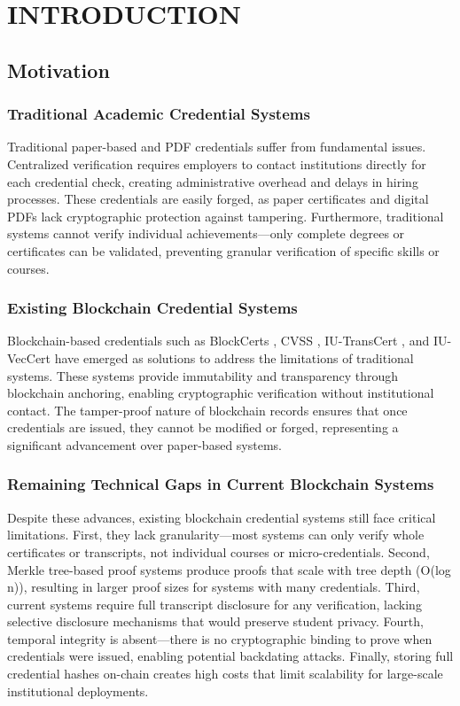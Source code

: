 \chapter{INTRODUCTION}
\label{ch:introduction}

\section{Motivation}

\subsection{Traditional Academic Credential Systems}
Traditional paper-based and PDF credentials suffer from fundamental issues. Centralized verification requires employers to contact institutions directly for each credential check, creating administrative overhead and delays in hiring processes. These credentials are easily forged, as paper certificates and digital PDFs lack cryptographic protection against tampering. Furthermore, traditional systems cannot verify individual achievements—only complete degrees or certificates can be validated, preventing granular verification of specific skills or courses.

\subsection{Existing Blockchain Credential Systems}
Blockchain-based credentials such as BlockCerts \cite{blockcerts_mit}, CVSS \cite{nguyen2018cvss}, IU-TransCert \cite{le_iutranscert}, and IU-VecCert \cite{nguyen2024iuvec} have emerged as solutions to address the limitations of traditional systems. These systems provide immutability and transparency through blockchain anchoring, enabling cryptographic verification without institutional contact. The tamper-proof nature of blockchain records ensures that once credentials are issued, they cannot be modified or forged, representing a significant advancement over paper-based systems.

\subsection{Remaining Technical Gaps in Current Blockchain Systems}
Despite these advances, existing blockchain credential systems still face critical limitations. First, they lack granularity—most systems can only verify whole certificates or transcripts, not individual courses or micro-credentials. Second, Merkle tree-based proof systems produce proofs that scale with tree depth (O(log n)), resulting in larger proof sizes for systems with many credentials. Third, current systems require full transcript disclosure for any verification, lacking selective disclosure mechanisms that would preserve student privacy. Fourth, temporal integrity is absent—there is no cryptographic binding to prove when credentials were issued, enabling potential backdating attacks. Finally, storing full credential hashes on-chain creates high costs that limit scalability for large-scale institutional deployments.

